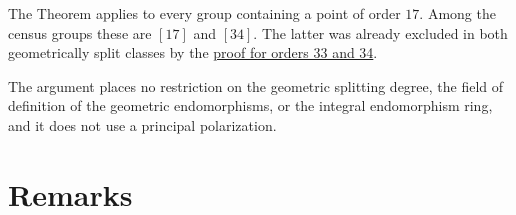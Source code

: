 \documentclass[11pt]{article}
\begin{document}
The Theorem applies to every group containing a point of order \(17\). Among the census groups
these are \href{https://genus-2-torsion.github.io/group.html?g=17}{\([17]\)} and
\href{https://genus-2-torsion.github.io/group.html?g=34}{\([34]\)}. The latter was already
excluded in both geometrically split classes by the
\href{https://genus-2-torsion.github.io/proofs/geometric-33-34-obstruction.html}{proof for orders
33 and 34}.

The argument places no restriction on the geometric splitting degree, the field of definition of
the geometric endomorphisms, or the integral endomorphism ring, and it does not use a principal
polarization.

\section{Remarks}\label{remarks}
\end{document}
